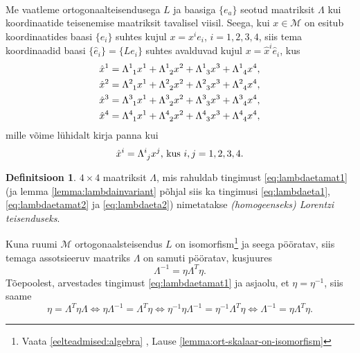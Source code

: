 \documentclass[a4paper,12pt]{article}
\theoremstyle{plain}
\theoremstyle{definition}
\newtheorem{definitsioon}{Definitsioon}[section]
\numberwithin{equation}{section}
\def\M{{\mathcal M}}
\begin{document}
\paragraph*{}
Me vaatleme ortogonaalteisendusega $L$ ja baasiga $\{e_a\}$ seotud maatriksit $\Lambda$ kui koordinaatide teisenemise maatriksit tavalisel viisil. Seega, kui $x \in \M$ on esitub koordinaatides baasi $\{e_i\}$ suhtes kujul $x = x^i e_i$, $i = 1, 2, 3, 4$, siis tema koordinaadid baasi $\{\hat{e}_i\} = \{Le_i\}$ suhtes avalduvad kujul $x = \hat{x}^i \hat{e}_i$, kus
\begin{align*}
\hat{x}^1 &= \Lambda\indices{^1_1} x^1 + \Lambda\indices{^1_2} x^2 + \Lambda\indices{^1_3} x^3 + \Lambda\indices{^1_4} x^4, \\
\hat{x}^2 &= \Lambda\indices{^2_1} x^1 + \Lambda\indices{^2_2} x^2 + \Lambda\indices{^2_3} x^3 + \Lambda\indices{^2_4} x^4, \\
\hat{x}^3 &= \Lambda\indices{^3_1} x^1 + \Lambda\indices{^3_2} x^2 + \Lambda\indices{^3_3} x^3 + \Lambda\indices{^3_4} x^4, \\
\hat{x}^4 &= \Lambda\indices{^4_1} x^1 + \Lambda\indices{^4_2} x^2 + \Lambda\indices{^4_3} x^3 + 
\Lambda\indices{^4_4} x^4,
\end{align*}
mille võime lühidalt kirja panna kui
\begin{equation*}
\hat{x}^i = \Lambda\indices{^i_j} x^j \text{, kus } i,j=1, 2, 3, 4.
\end{equation*}

\begin{definitsioon}
$4 \times 4$ maatriksit $\Lambda$, mis rahuldab tingimust \ref{eq:lambdaetamat1} (ja lemma \ref{lemma:lambdainvariant} põhjal siis ka tingimusi \ref{eq:lambdaeta1}, \ref{eq:lambdaetamat2} ja \ref{eq:lambdaeta2}) nimetatakse \emph{(homogeenseks) Lorentzi teisenduseks}.
\end{definitsioon}

Kuna ruumi $\M$ ortogonaalsteisendus $L$ on isomorfism\footnote{{Vaata \ref{eelteadmised:algebra} , Lause \ref{lemma:ort-skalaar-on-isomorfism}}} 
ja seega pööratav, siis temaga assotsieeruv maatriks $\Lambda$ on samuti pööratav, kusjuures
\begin{equation} \label{eq:lambda-1lambda-trans}
\Lambda^{-1} = \eta \Lambda^T \eta.
\end{equation}
Tõepoolest, arvestades tingimust \ref{eq:lambdaetamat1} ja asjaolu, et $\eta = \eta^{-1}$, siis saame
\begin{equation*}
\eta = \Lambda^T \eta \Lambda \iff \eta \Lambda^{-1} = \Lambda^T \eta \iff \eta^{-1} \eta \Lambda^{-1} = \eta^{-1} \Lambda^T \eta \iff \Lambda^{-1} = \eta \Lambda^T \eta.
\end{equation*}
\end{document}
